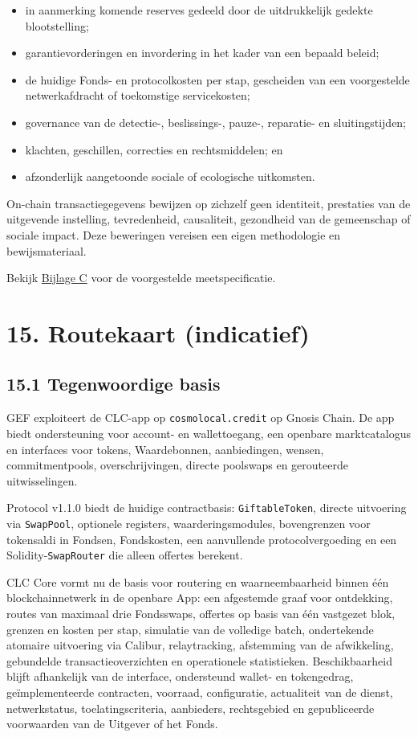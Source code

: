 \documentclass[11pt]{article}
\begin{document}
\begin{itemize}[leftmargin=*]
\item in aanmerking komende reserves gedeeld door de uitdrukkelijk gedekte blootstelling;
\item garantievorderingen en invordering in het kader van een bepaald beleid;
\item de huidige Fonds- en protocolkosten per stap, gescheiden van een voorgestelde netwerkafdracht of toekomstige servicekosten;
\item governance van de detectie-, beslissings-, pauze-, reparatie- en sluitingstijden;
\item klachten, geschillen, correcties en rechtsmiddelen; en
\item afzonderlijk aangetoonde sociale of ecologische uitkomsten.
\end{itemize}
On-chain transactiegegevens bewijzen op zichzelf geen identiteit, prestaties van de uitgevende instelling, tevredenheid, causaliteit, gezondheid van de gemeenschap of sociale impact. Deze beweringen vereisen een eigen methodologie en bewijsmateriaal.

Bekijk \href{https://docs.cosmolocal.credit/nl/white-paper/appendix-c-kpi-definitions}{Bijlage C} voor de voorgestelde meetspecificatie.


\section*{15. Routekaart (indicatief)}

\subsection*{15.1 Tegenwoordige basis}

GEF exploiteert de CLC-app op \texttt{cosmolocal.credit} op Gnosis Chain. De app biedt ondersteuning voor account- en wallettoegang, een openbare marktcatalogus en interfaces voor tokens, Waardebonnen, aanbiedingen, wensen, commitmentpools, overschrijvingen, directe poolswaps en gerouteerde uitwisselingen.

Protocol v1.1.0 biedt de huidige contractbasis: \texttt{GiftableToken}, directe uitvoering via \texttt{SwapPool}, optionele registers, waarderingsmodules, bovengrenzen voor tokensaldi in Fondsen, Fondskosten, een aanvullende protocolvergoeding en een Solidity-\texttt{SwapRouter} die alleen offertes berekent.

CLC Core vormt nu de basis voor routering en waarneembaarheid binnen één blockchainnetwerk in de openbare App: een afgestemde graaf voor ontdekking, routes van maximaal drie Fondsswaps, offertes op basis van één vastgezet blok, grenzen en kosten per stap, simulatie van de volledige batch, ondertekende atomaire uitvoering via Calibur, relaytracking, afstemming van de afwikkeling, gebundelde transactieoverzichten en operationele statistieken. Beschikbaarheid blijft afhankelijk van de interface, ondersteund wallet- en tokengedrag, geïmplementeerde contracten, voorraad, configuratie, actualiteit van de dienst, netwerkstatus, toelatingscriteria, aanbieders, rechtsgebied en gepubliceerde voorwaarden van de Uitgever of het Fonds.
\end{document}

